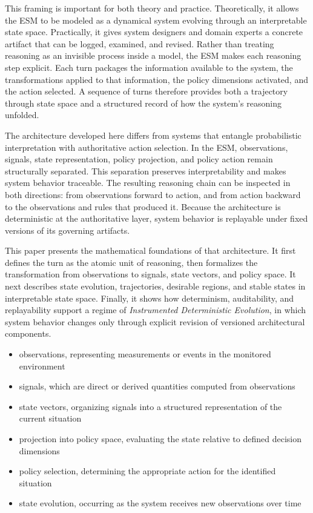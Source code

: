 \documentclass[11pt]{article}
\begin{document}
This framing is important for both theory and practice. Theoretically, it allows the ESM to be modeled as a dynamical system evolving through an interpretable state space. Practically, it gives system designers and domain experts a concrete artifact that can be logged, examined, and revised. Rather than treating reasoning as an invisible process inside a model, the ESM makes each reasoning step explicit. Each turn packages the information available to the system, the transformations applied to that information, the policy dimensions activated, and the action selected. A sequence of turns therefore provides both a trajectory through state space and a structured record of how the system’s reasoning unfolded.

The architecture developed here differs from systems that entangle probabilistic interpretation with authoritative action selection. In the ESM, observations, signals, state representation, policy projection, and policy action remain structurally separated. This separation preserves interpretability and makes system behavior traceable. The resulting reasoning chain can be inspected in both directions: from observations forward to action, and from action backward to the observations and rules that produced it. Because the architecture is deterministic at the authoritative layer, system behavior is replayable under fixed versions of its governing artifacts.

This paper presents the mathematical foundations of that architecture. It first defines the turn as the atomic unit of reasoning, then formalizes the transformation from observations to signals, state vectors, and policy space. It next describes state evolution, trajectories, desirable regions, and stable states in interpretable state space. Finally, it shows how determinism, auditability, and replayability support a regime of \emph{Instrumented Deterministic Evolution}, in which system behavior changes only through explicit revision of versioned architectural components.


\begin{itemize}
\item observations, representing measurements or events in the monitored environment
\item signals, which are direct or derived quantities computed from observations
\item state vectors, organizing signals into a structured representation of the current situation
\item projection into policy space, evaluating the state relative to defined decision dimensions
\item policy selection, determining the appropriate action for the identified situation
\item state evolution, occurring as the system receives new observations over time
\end{itemize}
\end{document}
